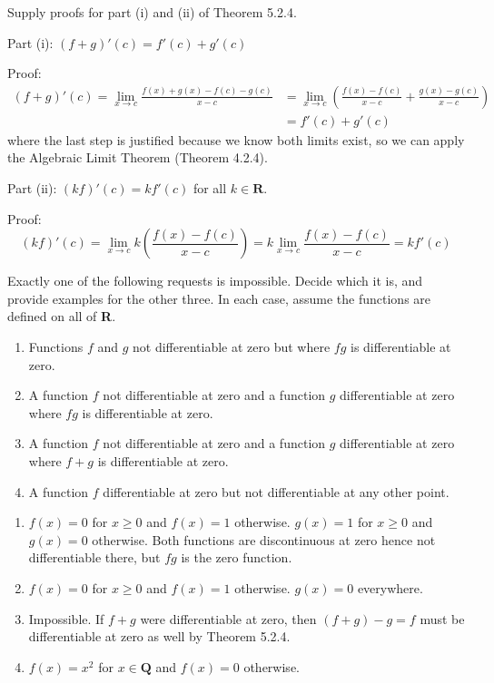 \documentclass{oxmathproblems}
\begin{document}
\begin{questions}

\miquestion Supply proofs for part (i) and (ii) of Theorem 5.2.4.
\begin{solution}
  Part (i): $(f+g)'(c) = f'(c) + g'(c)$

  Proof:
  \begin{align*}
     (f+g)'(c) = \lim_{x \to c}\frac{f(x)+g(x)-f(c)-g(c)}{x-c} &= \lim_{x \to c}\left(\frac{f(x)-f(c)}{x-c} + \frac{g(x)-g(c)}{x-c}\right)\\ 
     &= f'(c)+g'(c)
  \end{align*}
  where the last step is justified because we know both limits exist, so we can apply the Algebraic Limit Theorem (Theorem 4.2.4).

  Part (ii): $(kf)'(c) = kf'(c)$ for all $k \in \textbf{R}$.
  
  Proof:
  \[(kf)'(c) = \lim_{x \to c} k\left( \frac{f(x)-f(c)}{x-c} \right) = k \lim_{x \to c}\frac{f(x)-f(c)}{x-c} = kf'(c)\]
\end{solution}

\miquestion Exactly one of the following requests is impossible. Decide which it is, and provide examples for the other three. In each case, assume the functions are defined
on all of \textbf{R}.
\begin{enumerate}[label=(\alph*)]
  \item Functions $f$ and $g$ not differentiable at zero but where $fg$ is differentiable at zero.
  \item A function $f$ not differentiable at zero and a function $g$ differentiable at zero where $fg$ is differentiable at zero.
  \item A function $f$ not differentiable at zero and a function $g$ differentiable at zero where $f+g$ is differentiable at zero.
  \item A function $f$ differentiable at zero but not differentiable at any other point.
\end{enumerate}

\begin{solution}
  \begin{enumerate}[label=(\alph*)]
    \item $f(x) = 0$ for $x \geq 0$ and $f(x)=1$ otherwise. $g(x)=1$ for $x \geq 0$ and $g(x) = 0$ otherwise. Both functions are discontinuous at zero hence not differentiable there, but
    $fg$ is the zero function.
    \item $f(x) = 0$ for $x \geq 0$ and $f(x)=1$ otherwise. $g(x)=0$ everywhere.
    \item Impossible. If $f+g$ were differentiable at zero, then $(f+g)-g = f$ must be differentiable at zero as well by Theorem 5.2.4.
    \item $f(x) = x^2$ for $x \in \textbf{Q}$ and $f(x) = 0$ otherwise.
    

\end{enumerate}
\end{solution}
\end{questions}
\end{document}

